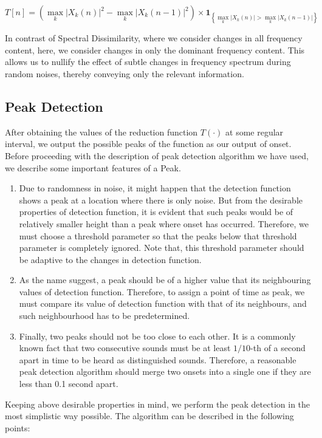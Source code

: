 \documentclass[10pt]{article}
\begin{document}
$$T[n] = \left(\max_k \vert X_k(n)\vert^2 - \max_k\vert X_k(n-1)\vert^2\right)\times \textbf{1}_{\left\{\max_k \vert X_k(n)\vert > \max_k\vert X_k(n-1)\vert\right\}}$$

In contrast of Spectral Dissimilarity, where we consider changes in all frequency content, here, we consider changes in only the dominant frequency content. This allows us to nullify the effect of subtle changes in frequency spectrum during random noises, thereby conveying only the relevant information.



\subsection{Peak Detection}
\qquad After obtaining the values of the reduction function $T(\cdot)$ at some regular interval, we output the possible peaks of the function as our output of onset. Before proceeding with the description of peak detection algorithm we have used, we describe some important features of a Peak.
\begin{enumerate}
    \item Due to randomness in noise, it might happen that the detection function shows a peak at a location where there is only noise. But from the desirable properties of detection function, it is evident that such peaks would be of relatively smaller height than a peak where onset has occurred. Therefore, we must choose a threshold parameter so that the peaks below that threshold parameter is completely ignored. Note that, this threshold parameter should be adaptive to the changes in detection function.
    \item As the name suggest, a peak should be of a higher value that its neighbouring values of detection function. Therefore, to assign a point of time as peak, we must compare its value of detection function with that of its neighbours, and such neighbourhood has to be predetermined.
    \item Finally, two peaks should not be too close to each other. It is a commonly known fact that two consecutive sounds must be at least $1/10$-th of a second apart in time to be heard as distinguished sounds. Therefore, a reasonable peak detection algorithm should merge two onsets into a single one if they are less than 0.1 second apart.
\end{enumerate}

Keeping above desirable properties in mind, we perform the peak detection in the most simplistic way possible. The algorithm can be described in the following points:
\end{document}
